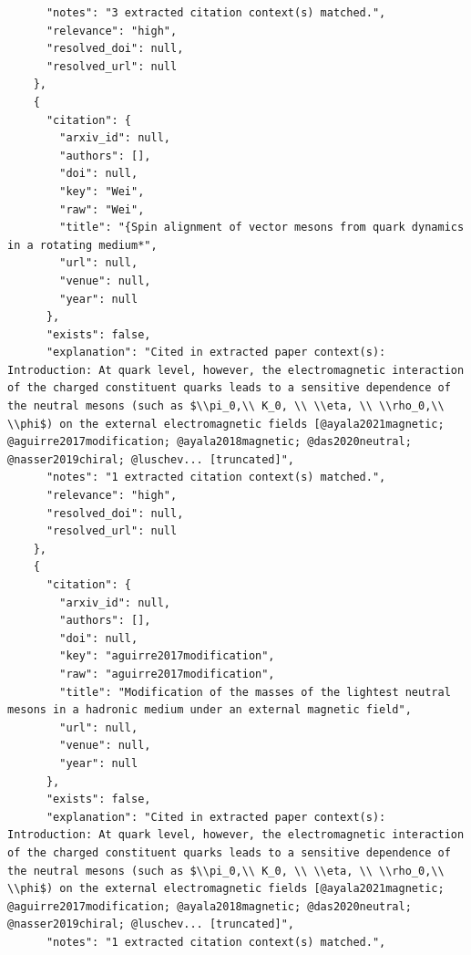 \documentclass[11pt]{article}
\begin{document}
\begin{verbatim}
      "notes": "3 extracted citation context(s) matched.",
      "relevance": "high",
      "resolved_doi": null,
      "resolved_url": null
    },
    {
      "citation": {
        "arxiv_id": null,
        "authors": [],
        "doi": null,
        "key": "Wei",
        "raw": "Wei",
        "title": "{Spin alignment of vector mesons from quark dynamics in a rotating medium*",
        "url": null,
        "venue": null,
        "year": null
      },
      "exists": false,
      "explanation": "Cited in extracted paper context(s): Introduction: At quark level, however, the electromagnetic interaction of the charged constituent quarks leads to a sensitive dependence of the neutral mesons (such as $\\pi_0,\\ K_0, \\ \\eta, \\ \\rho_0,\\ \\phi$) on the external electromagnetic fields [@ayala2021magnetic; @aguirre2017modification; @ayala2018magnetic; @das2020neutral; @nasser2019chiral; @luschev... [truncated]",
      "notes": "1 extracted citation context(s) matched.",
      "relevance": "high",
      "resolved_doi": null,
      "resolved_url": null
    },
    {
      "citation": {
        "arxiv_id": null,
        "authors": [],
        "doi": null,
        "key": "aguirre2017modification",
        "raw": "aguirre2017modification",
        "title": "Modification of the masses of the lightest neutral mesons in a hadronic medium under an external magnetic field",
        "url": null,
        "venue": null,
        "year": null
      },
      "exists": false,
      "explanation": "Cited in extracted paper context(s): Introduction: At quark level, however, the electromagnetic interaction of the charged constituent quarks leads to a sensitive dependence of the neutral mesons (such as $\\pi_0,\\ K_0, \\ \\eta, \\ \\rho_0,\\ \\phi$) on the external electromagnetic fields [@ayala2021magnetic; @aguirre2017modification; @ayala2018magnetic; @das2020neutral; @nasser2019chiral; @luschev... [truncated]",
      "notes": "1 extracted citation context(s) matched.",

\end{verbatim}
\end{document}
